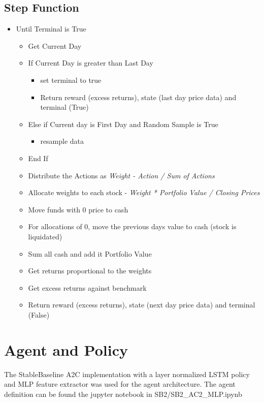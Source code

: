 \documentclass[oneside,12pt]{Classes/RoboticsLaTeX}
\begin{document}
\subsection{Step Function} \label{section:stepfunc}
\begin{itemize}
\item Until Terminal is True
    \begin{itemize}
    \item Get Current Day
    \item If Current Day is greater than Last Day 
        \begin{itemize}
        \item set terminal to true
        \item Return reward (excess returns), state (last day price data) and terminal (True)
    \end{itemize}
    \item Else if Current day is First Day and Random Sample is True
    \begin{itemize}
        \item resample data
    \end{itemize}
    \item End If
    \item Distribute the Actions as \textit{Weight - Action / Sum of Actions}
    \item Allocate weights to each stock - \textit{Weight * Portfolio Value / Closing Prices}
    \item Move funds with 0 price to cash
    \item For allocations of 0, move the previous days value to cash (stock is liquidated)
    \item Sum all cash and add it Portfolio Value
    \item Get returns proportional to  the weights
    \item Get excess returns against benchmark
    \item Return reward (excess returns), state (next day price data) and terminal (False)
    \end{itemize}
\end{itemize}

\section{Agent and Policy}
The StableBaseline \citep{stable-baselines} A2C implementation with a layer normalized LSTM policy and MLP feature extractor was used for the agent architecture. The agent definition can be found the jupyter notebook in  SB2/SB2\_AC2\_MLP.ipynb
\end{document}
